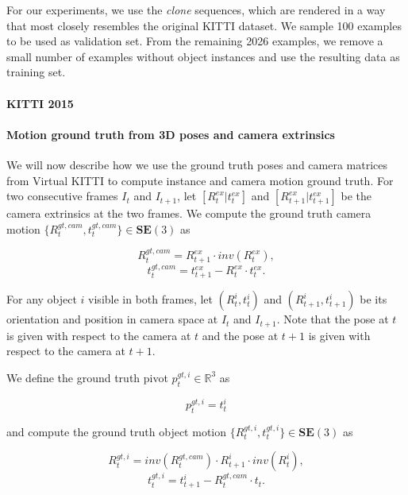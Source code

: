 For our experiments, we use the \emph{clone} sequences, which are rendered in a
way that most closely resembles the original KITTI dataset. We sample 100 examples
to be used as validation set. From the remaining 2026 examples,
we remove a small number of examples without object instances and use the resulting
data as training set.

\paragraph{KITTI 2015}

\paragraph{Motion ground truth from 3D poses and camera extrinsics}
We will now describe how we use the ground truth poses and camera matrices from Virtual KITTI to
compute instance and camera motion ground truth.
For two consecutive frames $I_t$ and $I_{t+1}$,
let $[R_t^{ex}|t_t^{ex}]$
and $[R_{t+1}^{ex}|t_{t+1}^{ex}]$
be the camera extrinsics at the two frames.
We compute the ground truth camera motion
$\{R_t^{gt, cam}, t_t^{gt, cam}\} \in \mathbf{SE}(3)$ as

\begin{equation}
R_{t}^{gt, cam} = R_{t+1}^{ex}  \cdot inv(R_t^{ex}),
\end{equation}
\begin{equation}
t_{t}^{gt, cam} = t_{t+1}^{ex}  - R_{t}^{ex} \cdot t_t^{ex}.
\end{equation}

For any object $i$ visible in both frames, let
$(R_t^i, t_t^i)$ and $(R_{t+1}^i, t_{t+1}^i)$
be its orientation and position in camera space
at $I_t$ and $I_{t+1}$.
Note that the pose at $t$ is given with respect to the camera at $t$ and
the pose at $t+1$ is given with respect to the camera at $t+1$.

We define the ground truth pivot $p_{t}^{gt, i} \in \mathbb{R}^3$ as

\begin{equation}
p_{t}^{gt, i} = t_t^i
\end{equation}

and compute the ground truth object motion
$\{R_t^{gt, i}, t_t^{gt, i}\} \in \mathbf{SE}(3)$ as

\begin{equation}
R_{t}^{gt, i} = inv(R_t^{gt, cam}) \cdot R_{t+1}^i \cdot inv(R_t^i),
\end{equation}
\begin{equation}
t_{t}^{gt, i} = t_{t+1}^{i}  - R_t^{gt, cam} \cdot t_t.
\end{equation}


